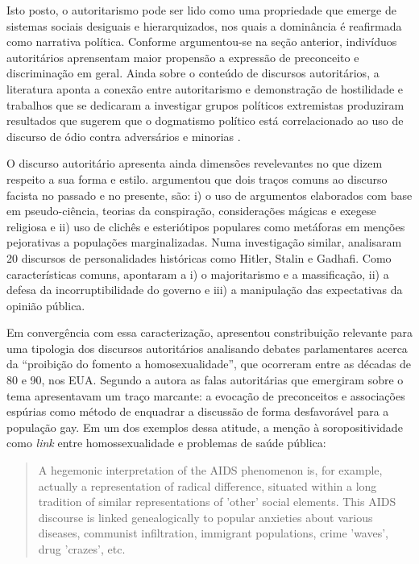 \documentclass[
12pt,				%
openright,			%
twoside,			%
a4paper,			%
english,			%
french,				%
spanish,			%
brazil				%
]{abntex2}
\begin{document}
Isto posto, o autoritarismo pode ser lido como uma propriedade que emerge de sistemas sociais desiguais e hierarquizados, nos quais a dominância é reafirmada como narrativa política. Conforme argumentou-se na seção anterior, indivíduos autoritários aprensentam maior propensão a expressão de preconceito e discriminação em geral. Ainda sobre o conteúdo de discursos autoritários, a literatura aponta a conexão entre autoritarismo e demonstração de hostilidade \cite{siegel1956relationship} e trabalhos que se dedicaram a investigar grupos políticos extremistas produziram resultados que sugerem que o dogmatismo político está correlacionado ao uso de discurso de ódio contra adversários e minorias \cite{gerstenfeld2003hate, ben2016hate}.  

O discurso autoritário apresenta ainda dimensões revelevantes no que dizem respeito a sua forma e estilo.  argumentou que dois traços comuns ao discurso facista no passado e no presente, são: i) o uso de argumentos elaborados com base em pseudo-ciência, teorias da conspiração, considerações mágicas e exegese religiosa e ii) uso de clichês e esteriótipos populares como metáforas em menções pejorativas a populações marginalizadas. Numa investigação similar,  analisaram 20 discursos de personalidades históricas como Hitler, Stalin e Gadhafi. Como características comuns, apontaram a i) o majoritarismo e a massificação, ii) a defesa da incorruptibilidade do governo e iii) a manipulação das expectativas da opinião pública.

Em convergência com essa caracterização,  apresentou constribuição relevante para uma tipologia dos discursos autoritários analisando debates parlamentares acerca da ``proibição do fomento a homosexualidade'', que ocorreram entre as décadas de 80 e 90, nos EUA. Segundo a autora as falas autoritárias que emergiram sobre o tema apresentavam um traço marcante: a evocação de preconceitos e associações espúrias como método de enquadrar a discussão de forma desfavorável para a população gay. Em um dos exemplos dessa atitude, a menção à soropositividade como \emph{link} entre homossexualidade e problemas de saúde pública:

\begin{quote}
	A hegemonic interpretation of the AIDS phenomenon is, for example, actually a representation of radical difference, situated within a long tradition of similar representations of 'other' social elements. This AIDS discourse is linked genealogically to popular anxieties about various diseases, communist infiltration, immigrant populations, crime 'waves', drug 'crazes', etc. \cite{smith2015advances}
\end{quote}
\end{document}

